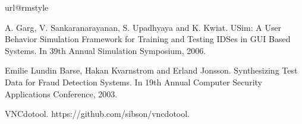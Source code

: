 
%
%
%

\begin{thebibliography}{10}
\providecommand{\url}[1]{#1}
\csname url@rmstyle\endcsname
\providecommand{\newblock}{\relax}
\providecommand{\bibinfo}[2]{#2}
\providecommand\BIBentrySTDinterwordspacing{\spaceskip=0pt\relax}
\providecommand\BIBentryALTinterwordstretchfactor{4}
\providecommand\BIBentryALTinterwordspacing{\spaceskip=\fontdimen2\font plus
\BIBentryALTinterwordstretchfactor\fontdimen3\font minus
  \fontdimen4\font\relax}
\providecommand\BIBforeignlanguage[2]{{%
\expandafter\ifx\csname l@#1\endcsname\relax
\typeout{** WARNING: IEEEtran.bst: No hyphenation pattern has been}%
\typeout{** loaded for the language `#1'. Using the pattern for}%
\typeout{** the default language instead.}%
\else
\language=\csname l@#1\endcsname
\fi
#2}}











A. Garg, V. Sankaranarayanan, S. Upadhyaya and K. Kwiat. USim: A User Behavior Simulation Framework for Training and Testing IDSes in GUI Based Systems. In 39th Annual Simulation Symposium, 2006.

Emilie Lundin Barse, Hakan Kvarnstrom and Erland Jonsson. Synthesizing Test Data for Fraud Detection Systems. In 19th Annual Computer Security Applications Conference, 2003.

VNCdotool. https://github.com/sibson/vncdotool.







\end{thebibliography}
